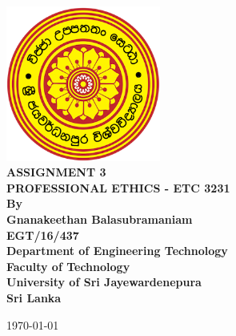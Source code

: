 \documentclass[12pt,a4paper,oneside]{article}
\begin{document}
\begin{titlepage}

\begin{flushright}
\end{flushright}


\center %
{
\includegraphics[width=2in,keepaspectratio]{logo.png}\\[0.5cm]
    \fontsize{24pt}{30}\selectfont \textbf{\uppercase{Assignment 3}}\\[1.5cm]
\fontsize{16}{24}\selectfont \textbf{\uppercase{Professional Ethics - ETC 3231}}\\[1.5cm]
\fontsize{16pt}{24}\selectfont \textbf{By}\\[0.5cm]
\fontsize{12pt}{12}\selectfont {
}
\vspace*{\fill}
\fontsize{12pt}{12}\selectfont \textbf { Gnanakeethan Balasubramaniam \\ EGT/16/437}\\[0.5cm]


\vspace*{\fill}
\fontsize{12pt}{12}\selectfont \textbf {Department of Engineering Technology \\ Faculty of Technology\\University of Sri Jayewardenepura\\ Sri Lanka \\ }
\vspace*{\fill}

\today
}


\end{titlepage}
\end{document}
